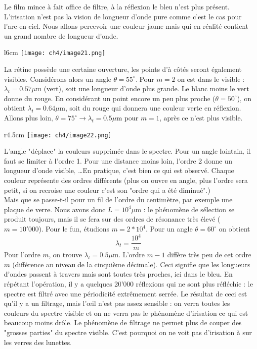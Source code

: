 Le film mince à fait office de filtre, à la réflexion le bleu n'est plus présent. L'irisation n'est 
pas la vision de longueur d'onde pure comme c'est le cas pour l'arc-en-ciel. Nous allons percevoir 
une couleur jaune mais qui en réalité contient un grand nombre de longueur d'onde.\\

	\begin{wrapfigure}[8]{l}{6cm}
	\vspace{-5mm}
	\texttt{[image: ch4/image21.png]}
	\end{wrapfigure}
La rétine possède une certaine ouverture, les points d'à côtés seront également visibles. Considérons 
alors un angle $\theta = 55^\circ$. Pour $m=2$ on est dans le visible : $\lambda_t=0.57\mu$m (vert), 
soit une longueur d'onde plus grande. Le blanc moins le vert donne du rouge. En considérant un point 
encore un peu plus proche ($\theta =50^\circ$), on obtient $\lambda_t = 0.64\mu$m, soit du rouge qui 
donnera une couleur verte en réflexion. Allons plus loin, $\theta = 75^\circ\rightarrow \lambda_t = 0.5
\mu$m pour $m=1$, après ce n'est plus visible. \\

	\begin{wrapfigure}[15]{r}{4.5cm}
	\vspace{-5mm}
	\texttt{[image: ch4/image22.png]}
	\end{wrapfigure}
L'angle "déplace" la couleurs supprimée dans le spectre. Pour un angle lointain, il faut se limiter 
à l'ordre 1. Pour une distance moins loin, l'ordre 2 donne un longueur d'onde visible, \dots En 
pratique, c'est bien ce qui est observé. Chaque couleur représente des ordres différents (plus on 
ouvre en angle, plus l'ordre sera petit, si on recroise une couleur c'est son "ordre qui a été 
diminué".)\\

Mais que se passe-t-il pour un fil de l'ordre du centimètre, par exemple une plaque de verre. Nous 
avons donc $L=10^4\mu$m : le phénomène de sélection se produit toujours, mais il se fera sur des 
ordres de résonance très élevé ($m=10'000$). Pour le fun, étudions $m=2*10^4$. Pour un angle 
$\theta=60^\circ$ on obtient
\begin{equation}
\lambda_t = \frac{10^4}{m}
\end{equation}
Pour l'ordre $m$, on trouve $\lambda_t = 0.5\mu$m. L'ordre $m-1$ diffère très peu de cet ordre $m$ 
(différence au niveau de la cinquième décimale). Ceci signifie que les longueurs d'ondes passent 
à travers mais sont toutes très proches, ici dans le bleu. En répétant l'opération, il y a quelques 
20'000 réflexions qui ne sont plus réfléchie : le spectre est filtré avec une périodicité extrêmement 
serrée. Le résultat de ceci est qu'il y a un filtrage, mais l’œil n'est pas assez sensible : on 
verra toutes les couleurs du spectre visible et on ne verra pas le phénomène d'irisation ce qui est 
beaucoup moins drôle. Le phénomène de filtrage ne permet plus de couper des "grosses parties" du 
spectre visible. C'est pourquoi on ne voit pas d’irisation à sur les verres des lunettes.\\

